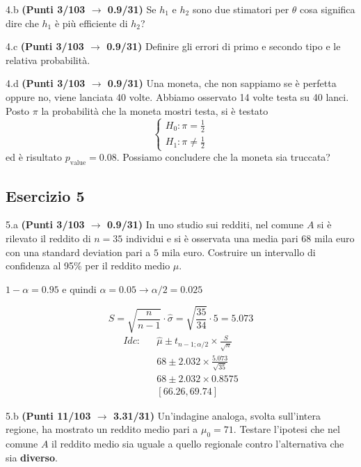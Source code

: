 \documentclass[
  11pt,
]{book}
\theoremstyle{mytheoremstyle}
\theoremstyle{mydefstyle}
\newenvironment{sol}
  {
  \begin{tcolorbox}[enhanced,breakable,arc=0.1mm,boxrule=1pt,colback=white,colframe=iblue,
  title=\bf \fontfamily{lmss}\selectfont \hspace{.5 cm} Soluzione,drop fuzzy shadow]

}{
\end{tcolorbox}
  }
\begin{document}
4.b \textbf{(Punti 3/103 \(\rightarrow\) 0.9/31)} Se \(h_1\) e \(h_2\) sono due stimatori per \(\theta\) cosa significa dire che \(h_1\) è più efficiente di \(h_2\)?

4.c \textbf{(Punti 3/103 \(\rightarrow\) 0.9/31)} Definire gli errori di primo e secondo tipo e le relativa probabilità.

4.d \textbf{(Punti 3/103 \(\rightarrow\) 0.9/31)} Una moneta, che non sappiamo se è perfetta oppure no, viene lanciata 40 volte. Abbiamo osservato 14 volte testa su 40 lanci. Posto \(\pi\) la probabilità che la moneta mostri testa, si è testato
\[
\begin{cases}
H_0:\pi=\frac 12\\
H_1:\pi\ne\frac 12
\end{cases}
\]
ed è risultato \(p_\text{value}=0.08\). Possiamo concludere che la moneta sia truccata?

\subsection{Esercizio 5}\label{esercizio-5-22}

5.a \textbf{(Punti 3/103 \(\rightarrow\) 0.9/31)} In uno studio sui redditi, nel comune \(A\) si è rilevato il reddito di \(n=35\) individui e si è osservata una media pari \(68\) mila euro con una standard deviation pari a \(5\) mila euro.
Costruire un intervallo di confidenza al 95\% per il reddito medio \(\mu\).

\begin{sol}
\(1-\alpha =0.95\) e quindi \(\alpha=0.05\rightarrow \alpha/2=0.025\)

\[
      S  =\sqrt{\frac {n}{n-1}}\cdot\hat\sigma =
     \sqrt{\frac { 35 }{ 34 }}\cdot 5 = 5.073 
\]
\begin{eqnarray*}
  Idc: & &  \hat\mu \pm  t_{n-1;\alpha/2} \times \frac{S}{\sqrt{n}} \\
     & &  68 \pm  2.032 \times \frac{ 5.073 }{\sqrt{ 35 }} \\
     & &  68 \pm  2.032 \times  0.8575 \\
     & & [ 66.26 ,  69.74 ]
\end{eqnarray*}

\end{sol}

5.b \textbf{(Punti 11/103 \(\rightarrow\) 3.31/31)} Un'indagine analoga, svolta sull'intera regione, ha mostrato un reddito medio pari a \(\mu_0=71\). Testare l'ipotesi che nel comune \(A\) il reddito medio sia uguale a quello regionale contro l'alternativa che sia \textbf{diverso}.
\end{document}
